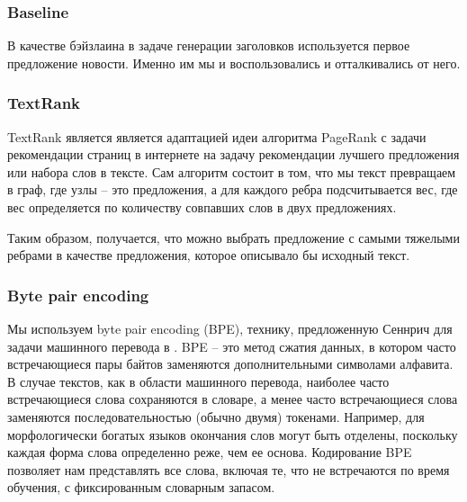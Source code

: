 \documentclass[14pt]{matmex-diploma-custom}
\begin{document}
\subsubsection{Baseline}

В качестве бэйзлаина в задаче генерации заголовков используется первое предложение новости. Именно им мы и воспользовались и отталкивались от него.


\subsubsection{TextRank}

TextRank является является адаптацией идеи алгоритма PageRank \cite{Page98thepagerank} с задачи рекомендации страниц в интернете на задачу рекомендации лучшего предложения или набора слов в тексте. Сам алгоритм состоит в том, что мы текст превращаем в граф, где узлы -- это предложения, а для каждого ребра подсчитывается вес, где вес определяется по количеству совпавших слов в двух предложениях.

Таким образом, получается, что можно выбрать предложение с самыми тяжелыми ребрами в качестве предложения, которое описывало бы исходный текст.




\subsubsection{Byte pair encoding}

Мы используем byte pair encoding (BPE), технику, предложенную Сеннрич для задачи машинного перевода в \cite{DBLP:journals/corr/SennrichHB15}. BPE -- это метод сжатия данных, в котором часто встречающиеся пары байтов заменяются дополнительными символами алфавита. В случае текстов, как в области машинного перевода, наиболее часто встречающиеся слова сохраняются в словаре, а менее часто встречающиеся слова заменяются последовательностью (обычно двумя) токенами. Например, для морфологически богатых языков окончания слов могут быть отделены, поскольку каждая форма слова определенно реже, чем ее основа. Кодирование BPE позволяет нам представлять все слова, включая те, что не встречаются по время обучения, с фиксированным словарным запасом.
\end{document}
